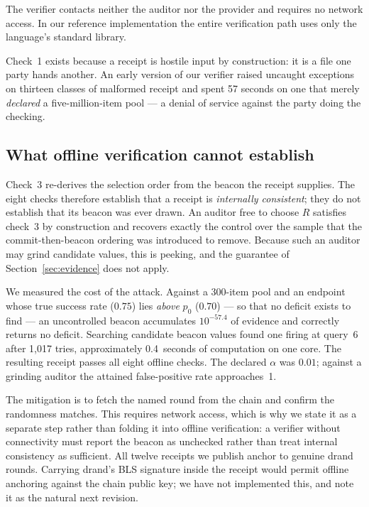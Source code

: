 \documentclass[11pt]{article}
\theoremstyle{definition}
\begin{document}
\noindent The verifier contacts neither the auditor nor the provider and
requires no network access. In our reference implementation the entire
verification path uses only the language's standard library.

Check~1 exists because a receipt is hostile input by construction: it is a file
one party hands another. An early version of our verifier raised uncaught
exceptions on thirteen classes of malformed receipt and spent 57 seconds on one
that merely \emph{declared} a five-million-item pool --- a denial of service
against the party doing the checking.

\subsection{What offline verification cannot establish}
\label{sec:beacon-anchor}

Check~3 re-derives the selection order from the beacon the receipt supplies.
The eight checks therefore establish that a receipt is \emph{internally
consistent}; they do not establish that its beacon was ever drawn. An auditor
free to choose $R$ satisfies check~3 by construction and recovers exactly the
control over the sample that the commit-then-beacon ordering was introduced to
remove. Because such an auditor may grind candidate values, this is peeking, and
the guarantee of Section~\ref{sec:evidence} does not apply.

We measured the cost of the attack. Against a 300-item pool and an endpoint
whose true success rate ($0.75$) lies \emph{above} $p_0$ ($0.70$) --- so that no
deficit exists to find --- an uncontrolled beacon accumulates $10^{-57.4}$ of
evidence and correctly returns no deficit. Searching candidate beacon values
found one firing at query~6 after 1{,}017 tries, approximately 0.4~seconds of
computation on one core. The resulting receipt passes all eight offline checks.
The declared $\alpha$ was $0.01$; against a grinding auditor the attained
false-positive rate approaches~1.

The mitigation is to fetch the named round from the chain and confirm the
randomness matches. This requires network access, which is why we state it as a
separate step rather than folding it into offline verification: a verifier
without connectivity must report the beacon as unchecked rather than treat
internal consistency as sufficient. All twelve receipts we publish anchor to
genuine drand rounds. Carrying drand's BLS signature inside the receipt would
permit offline anchoring against the chain public key; we have not implemented
this, and note it as the natural next revision.
\end{document}
